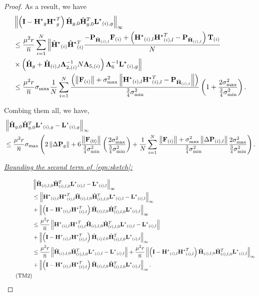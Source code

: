 \documentclass[twoside,11pt]{article}
\newcommand{\norm}[1]{\left\lVert#1\right\rVert}
\newcommand{\matF}{\mathbf{F}}
\newcommand{\hmatHst}{{\hat{\mathbf{H}}}^{\star}{}}
\newcommand{\hmatH}{{\hat{\mathbf{H}}}{}}
\newcommand{\matHst}{{\mathbf{H}^\star}}
\newcommand{\matI}{\mathbf{I}}
\newcommand{\matLst}{{\mathbf{L}^\star}}
\newcommand{\matP}{\mathbf{P}}
\newcommand{\matT}{\mathbf{T}}
\newcommand{\matLambda}{\mathbf{\Lambda}}
\newcommand{\gop}{\sigma_{\max}}
\newcommand{\murnb}{\frac{\mu^2 r}{\overline{n}}}
\newcommand{\sms}{\sigma_{\min}^2}
\newcommand{\tkappa}{\frac{2\gop^2}{\frac{3}{4}\sms}}
\newcommand{\brtkappa}{\left(\frac{2\gop^2}{\frac{3}{4}\sms}\right)}
\begin{document}
\begin{proof}
As a result, we have
\begin{align}
&\norm{\left(\matI-\matHst_{g}\matHst_{g}^T\right)\hmatH_{g,0}\hmatH_{g,0}^T\matLst_{(i),g}}_{\infty}\notag\\
&\le \murnb\sum_{i=1}^N\Big\lVert
\hmatHst_{(i)}\hmatHst_{(i)}^T\frac{-\matP_{\hmatH_{(i),l}}\matF_{(i)}+\left(\matHst_{(i),l}\matHst_{(i),l}^T-\matP_{\hmatH_{(i),l}}\right)\matT_{(i)}}{N}\notag\\
&\times\left(\hmatH_g+\hmatH_{(i),l}\matLambda_{2,(i)}^{-1}N\matLambda_{5,(i)}\right)\matLambda_6^{-1}\matLst_{(i),g}\Big\rVert\notag\\
&\le \murnb \gop\frac{1}{N}\sum_{i=1}^N\frac{\left(\norm{\matF_{(i)}}+\gop^2\norm{\matHst_{(i),l}\matHst_{(i),l}^T-\matP_{\hmatH_{(i),l}}}\right)}{\frac{3}{4}\sms}\left(1+\frac{2\gop^2}{{\frac{3}{4}\sms}}\right).\notag
\end{align}

Combing them all, we have,
\begin{align}
&\norm{\hmatH_{g,0}\hmatH_{g,0}^T\matLst_{(i),g}-\matLst_{(i),g}}_{\infty}\notag\\
&\le \murnb \gop\left(2\norm{\Delta\matP_g}+6\frac{\norm{\matF_{(0)}}}{\frac{3}{4}\sms}\brtkappa+\frac{1}{N}\sum_{i=1}^N\frac{\norm{\matF_{(i)}}+\gop^2\norm{\Delta\matP_{(i),l}} }{\frac{3}{4}\sms}\tkappa\right).
\label{eqn:firsttermagain}
\end{align}



\noindent\underline{\it Bounding the second term of~\eqref{eqn:sketch}:}

\begin{align}
&\norm{\hmatH_{(i),l,0}\hmatH_{(i),l,0}^T\matLst_{(i),l}-\matLst_{(i),l}}_{\infty}\notag\\
&\le \norm{\matHst_{(i),l}\matHst_{(i),l}^T\hmatH_{(i),l,0}\hmatH_{(i),l,0}^T\matLst_{(i),l}-\matLst_{(i),l}}_{\infty}\notag\\
&+\norm{\left(\matI-\matHst_{(i),l}\matHst_{(i),l}^T\right)\hmatH_{(i),l,0}\hmatH_{(i),l,0}^T\matLst_{(i),l}}_{\infty}\notag\\
&\le \murnb\norm{\matHst_{(i),l}\matHst_{(i),l}^T\hmatH_{(i),l,0}\hmatH_{(i),l,0}^T\matLst_{(i),l}-\matLst_{(i),l}}\notag\\
&+\norm{\left(\matI-\matHst_{(i),l}\matHst_{(i),l}^T\right)\hmatH_{(i),l,0}\hmatH_{(i),l,0}^T\matLst_{(i),l}}_{\infty}\notag\\
&\le \murnb\norm{\hmatH_{(i),l,0}\hmatH_{(i),l,0}^T\matLst_{(i),l}-\matLst_{(i),l}}+\murnb\norm{\left(\matI-\matHst_{(i),l}\matHst_{(i),l}^T\right)\hmatH_{(i),l,0}\hmatH_{(i),l,0}^T\matLst_{(i),l}}_{\infty}\notag\\
&+\norm{\left(\matI-\matHst_{(i),l}\matHst_{(i),l}^T\right)\hmatH_{(i),l,0}\hmatH_{(i),l,0}^T\matLst_{(i),l}}_{\infty}.\notag\\
\label{eqn:secondterm}\tag{TM2}
\end{align}


\end{proof}
\end{document}
